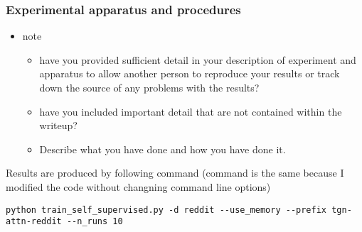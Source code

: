 \documentclass[11pt]{article}
\begin{document}
\subsubsection{Experimental apparatus and procedures}
\label{sec:orgb39fb36}
\begin{itemize}
\item note
\begin{itemize}
\item have you provided sufficient detail in your description of experiment and apparatus to allow another person to reproduce your results or track down the source of any problems with the results?
\item have you included important detail that are not contained within the writeup?
\item Describe what you have done and how you have done it.
\end{itemize}
\end{itemize}

Results are produced by following command (command is the same because I modified the code without changning command line options)
\begin{verbatim}
python train_self_supervised.py -d reddit --use_memory --prefix tgn-attn-reddit --n_runs 10
\end{verbatim}
\end{document}
